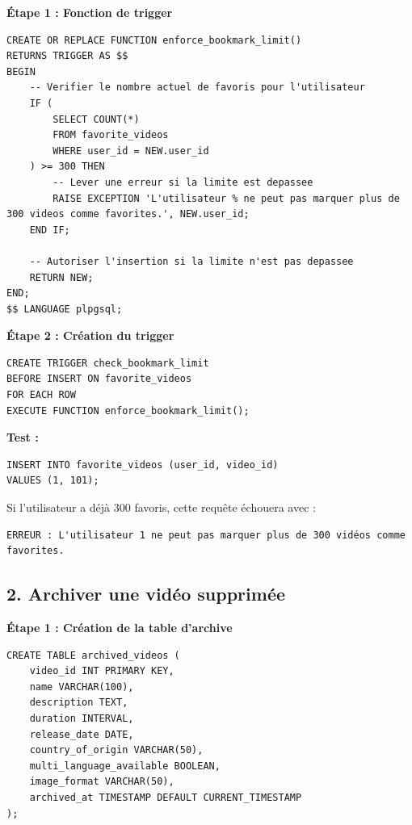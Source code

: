 \documentclass[a4paper, 12pt]{article}
\begin{document}
\textbf{Étape 1 : Fonction de trigger}

\begin{lstlisting}
CREATE OR REPLACE FUNCTION enforce_bookmark_limit()
RETURNS TRIGGER AS $$
BEGIN
    -- Verifier le nombre actuel de favoris pour l'utilisateur
    IF (
        SELECT COUNT(*) 
        FROM favorite_videos 
        WHERE user_id = NEW.user_id
    ) >= 300 THEN
        -- Lever une erreur si la limite est depassee
        RAISE EXCEPTION 'L'utilisateur % ne peut pas marquer plus de 300 videos comme favorites.', NEW.user_id;
    END IF;

    -- Autoriser l'insertion si la limite n'est pas depassee
    RETURN NEW;
END;
$$ LANGUAGE plpgsql;
\end{lstlisting}

\textbf{Étape 2 : Création du trigger}

\begin{lstlisting}
CREATE TRIGGER check_bookmark_limit
BEFORE INSERT ON favorite_videos
FOR EACH ROW
EXECUTE FUNCTION enforce_bookmark_limit();
\end{lstlisting}

\textbf{Test :}

\begin{lstlisting}
INSERT INTO favorite_videos (user_id, video_id)
VALUES (1, 101);
\end{lstlisting}

Si l'utilisateur a déjà 300 favoris, cette requête échouera avec :

\begin{verbatim}
ERREUR : L'utilisateur 1 ne peut pas marquer plus de 300 vidéos comme favorites.
\end{verbatim}

\subsection*{2. Archiver une vidéo supprimée}

\textbf{Étape 1 : Création de la table d'archive}

\begin{lstlisting}
CREATE TABLE archived_videos (
    video_id INT PRIMARY KEY,
    name VARCHAR(100),
    description TEXT,
    duration INTERVAL,
    release_date DATE,
    country_of_origin VARCHAR(50),
    multi_language_available BOOLEAN,
    image_format VARCHAR(50),
    archived_at TIMESTAMP DEFAULT CURRENT_TIMESTAMP
);
\end{lstlisting}
\end{document}
